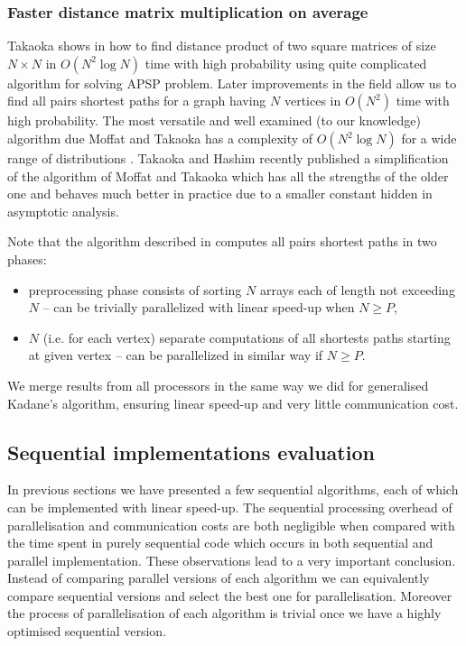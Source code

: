 \subsubsection*{Faster distance matrix multiplication on average}

Takaoka shows in \cite{TakaokaMSA} how to find distance product of two square matrices of size $N \times N$ in $O(N^2 \log{N})$ time with high probability using quite complicated algorithm for solving APSP problem.
Later improvements in the field allow us to find all pairs shortest paths for a graph having $N$ vertices in $O(N^2)$ time with high probability.
The most versatile and well examined (to our knowledge) algorithm due Moffat and Takaoka has a complexity of $O(N^2 \log{N})$ for a wide range of distributions \cite{MoffatTakaoka}.
Takaoka and Hashim recently published \cite{TakaokaHashim} a simplification of the algorithm of Moffat and Takaoka which has all the strengths of the older one and behaves much better in practice due to a smaller constant hidden in asymptotic analysis.

Note that the algorithm described in \cite{TakaokaHashim} computes all pairs shortest paths in two phases:
\begin{itemize}
    \item preprocessing phase consists of sorting $N$ arrays each of length not exceeding $N$ -- can be trivially parallelized with linear speed-up when $N \geq P$,
    \item $N$ (i.e. for each vertex) separate computations of all shortests paths starting at given vertex -- can be parallelized in similar way if $N \geq P$.
\end{itemize}
We merge results from all processors in the same way we did for generalised Kadane's algorithm, ensuring linear speed-up and very little communication cost.

\subsection*{Sequential implementations evaluation}

In previous sections we have presented a few sequential algorithms, each of which can be implemented with linear speed-up.
The sequential processing overhead of parallelisation and communication costs are both negligible when compared with the time spent in purely sequential code which occurs in both sequential and parallel implementation.
These observations lead to a very important conclusion.
Instead of comparing parallel versions of each algorithm we can equivalently compare sequential versions and select the best one for parallelisation.
Moreover the process of parallelisation of each algorithm is trivial once we have a highly optimised sequential version.

